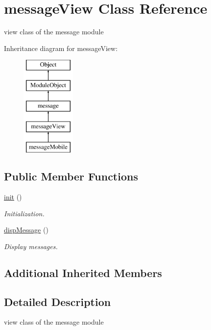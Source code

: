 \hypertarget{classmessageView}{}\section{message\+View Class Reference}
\label{classmessageView}


view class of the message module  


Inheritance diagram for message\+View\+:\begin{figure}[H]
\begin{center}
\leavevmode
\includegraphics[height=5.000000cm]{classmessageView}
\end{center}
\end{figure}
\subsection*{Public Member Functions}
\begin{DoxyCompactItemize}
\item 
\hyperlink{classmessageView_a247eb797a3d57ab05fc99d629014989a}{init} ()
\begin{DoxyCompactList}\small\item\em Initialization. \end{DoxyCompactList}\item 
\hyperlink{classmessageView_aba0cda32f7981221f5a05f2bc8edb302}{disp\+Message} ()
\begin{DoxyCompactList}\small\item\em Display messages. \end{DoxyCompactList}\end{DoxyCompactItemize}
\subsection*{Additional Inherited Members}


\subsection{Detailed Description}
view class of the message module 

